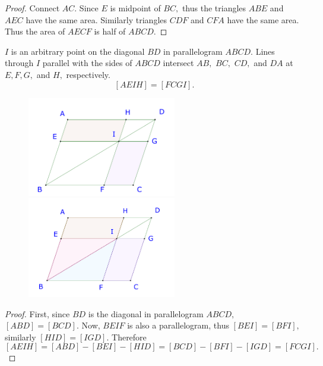 \documentclass{article}
\begin{document}
\begin{proof}
    Connect $AC.$ Since $E$ is midpoint of $BC,$ thus the triangles $ABE$ and $AEC$ have the same area.
    Similarly triangles $CDF$ and $CFA$ have the same area. Thus the area of $AECF$ is half of $ABCD.$
\end{proof}

\begin{example*}[Example 3]
    \label{example:23-24-s3-i-p3}
    $I$ is an arbitrary point on the diagonal $BD$ in parallelogram $ABCD.$
    Lines through $I$ parallel with the sides of $ABCD$ intersect $AB,$ $BC,$ $CD,$ and $DA$ at $E, F, G,$ and $H,$ respectively.
    \[
        [AEIH] = [FCGI].
    \]
\end{example*}

\begin{figure}[h]
    \centering
    \begin{minipage}[t]{6.5cm}
        \begin{center}
            \includegraphics[width=6.5cm]{./svg/pdf/23-24-s3-i-p3.pdf}
        \end{center}
    \end{minipage}
    \qquad
    \begin{minipage}[t]{6.5cm}
        \centering
        \begin{center}
            \includegraphics[width=6.5cm]{./svg/pdf/23-24-s3-i-p3-s.pdf}
        \end{center}
    \end{minipage}
\end{figure}

\begin{proof}
    First, since $BD$ is the diagonal in parallelogram $ABCD,$ $[ABD] = [BCD].$
    Now, $BEIF$ is also a parallelogram, thus $[BEI] = [BFI],$ similarly $[HID] = [IGD].$
    Therefore 
    \[
        [AEIH] = [ABD] - [BEI] - [HID] = [BCD] - [BFI] - [IGD] = [FCGI].
    \]
\end{proof}
\end{document}
